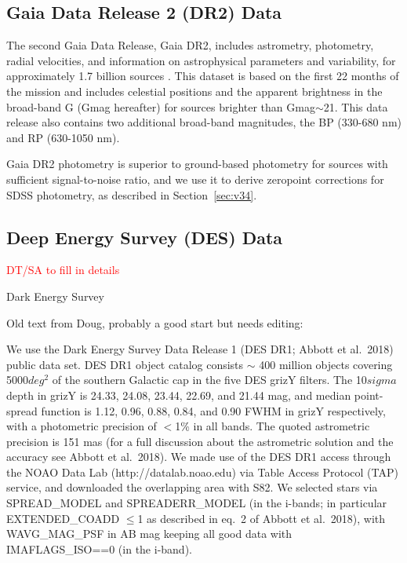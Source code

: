 \documentclass{aastex63}
\newcommand{\tbd}[1]{\textcolor{red}{#1}} %
\begin{document}
\subsection{Gaia Data Release 2 (DR2) Data} \label{ssec:gaia}
 
The second Gaia Data Release, Gaia DR2, includes astrometry, photometry, radial velocities, and information on astrophysical parameters and variability, for approximately 1.7 billion sources \citep{2018A&A...616A...1G}. This dataset is based on the first 22 months of the mission and includes celestial positions and the apparent brightness in the broad-band G (Gmag hereafter) for sources brighter than Gmag$\sim$21.  This data release also contains two additional broad-band magnitudes, the BP (330-680 nm) and RP (630-1050 nm).
    
Gaia DR2 photometry is superior to ground-based photometry for sources with sufficient signal-to-noise ratio, and we use 
it to derive zeropoint corrections for SDSS photometry, as described in Section~\ref{sec:v34}. 


\subsection{Deep Energy Survey (DES) Data} \label{ssec:des}

\tbd{DT/SA to fill in details}
 
Dark Energy Survey \citep{2016MNRAS.460.1270D}

Old text from Doug, probably a good start but needs editing: 

We use the Dark Energy Survey Data Release 1 (DES DR1; Abbott et al.\ 2018) public data set. DES DR1 object catalog consists $\sim$ 400 million objects covering 5000$deg^{2}$ of the southern Galactic cap in the five DES grizY filters. The 10$sigma$ depth in grizY is 24.33, 24.08, 23.44, 22.69, and 21.44 mag, and median point-spread function is 1.12, 0.96, 0.88, 0.84, and 0.90 FWHM in grizY respectively, with a photometric precision of $<$1\% in all bands. The quoted astrometric precision is 151 mas (for a full discussion about the astrometric solution and the accuracy see Abbott et al.\ 2018). We made use of the DES DR1 access through the NOAO Data Lab (http://datalab.noao.edu) via Table Access Protocol (TAP) service, and downloaded the overlapping area with S82. We selected stars via SPREAD\_MODEL and SPREADERR\_MODEL (in the i-bands; in particular EXTENDED\_COADD $\leq$1 as described in eq.~2 of Abbott et al.\ 2018), with WAVG\_MAG\_PSF in AB mag keeping all good data with IMAFLAGS\_ISO==0 (in the i-band).
\end{document}
